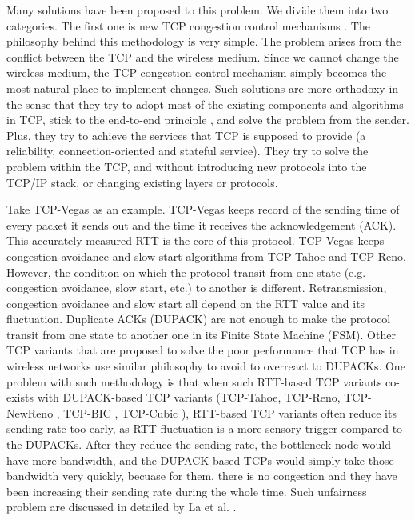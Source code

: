 \documentclass[10pt, conference, final, letterpaper]{IEEEtran}
\theoremstyle{definition}
\begin{document}
\begin{comment}
Unfortunately, we cannot address this problem by completely switching to UDP \cite{UDP} in a wireless context. One reason is that there are many existing applications (including World Wide Web) rely on TCP as a transport layer protocol. Abandoning TCP in wireless networks also means losing such applications. The other reason is TCP and UDP provide different types of services. TCP is a connection-oriented, stateful protocol that provides reliable transmission service, whereas UDP is connection-less and state-less and only provides best-effort transmission service. Using one to replace the other simply does not make much sense.
\end{comment}

Many solutions have been proposed to this problem. We divide them into two categories. The first one is new TCP congestion control mechanisms \cite{CongestionControl}. The philosophy behind this methodology is very simple. The problem arises from the conflict between the TCP and the wireless medium. Since we cannot change the wireless medium, the TCP congestion control mechanism simply becomes the most natural place to implement changes. Such solutions are more orthodoxy in the sense that they try to adopt most of the existing components and algorithms in TCP, stick to the end-to-end principle \cite{end2end}, and solve the problem from the sender. Plus, they try to achieve the services that TCP is supposed to provide (a reliability, connection-oriented and stateful service). They try to solve the problem within the TCP, and without introducing new protocols into the TCP/IP stack, or changing existing layers or protocols. 

Take TCP-Vegas \cite{TCP-Vegas} as an example. TCP-Vegas keeps record of the sending time of every packet it sends out and the time it receives the acknowledgement (ACK). This accurately measured RTT is the core of this protocol. TCP-Vegas keeps congestion avoidance and slow start algorithms from TCP-Tahoe and TCP-Reno. However, the condition on which the protocol transit from one state (e.g. congestion avoidance, slow start, etc.) to another is different. Retransmission, congestion avoidance and slow start all depend on the RTT value and its fluctuation. Duplicate ACKs (DUPACK) are not enough to make the protocol transit from one state to another one in its Finite State Machine (FSM). Other TCP variants that are proposed to solve the poor performance that TCP has in wireless networks use similar philosophy to avoid to overreact to DUPACKs. One problem with such methodology is that when such RTT-based TCP variants co-exists with DUPACK-based TCP variants (TCP-Tahoe, TCP-Reno, TCP-NewReno \cite{NewReno-RFC} \cite{NewReno-Paper}, TCP-BIC \cite{TCP-BIC}, TCP-Cubic \cite{TCP-Cubic}), RTT-based TCP variants often reduce its sending rate too early, as RTT fluctuation is a more sensory trigger compared to the DUPACKs. After they reduce the sending rate, the bottleneck node would have more bandwidth, and the DUPACK-based TCPs would simply take those bandwidth very quickly, becuase for them, there is no congestion and they have been increasing their sending rate during the whole time. Such unfairness problem are discussed in detailed by La et al. \cite{VegasIssue}.
\end{document}
